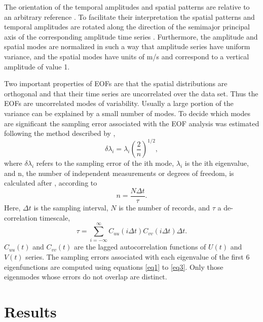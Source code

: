 The orientation of the temporal amplitudes and spatial patterns
are relative to an arbitrary reference \citep{kundu76}. To
facilitate their interpretation the spatial patterns and temporal
amplitudes are rotated along the direction of the semimajor
principal axis of the corresponding amplitude time series
\citep{merrifield89}. Furthermore, the amplitude and spatial modes
are normalized in such a way that amplitude series have uniform
variance, and the spatial modes have units of m/s and correspond
to a vertical amplitude of value 1.

Two important properties of EOFs are that the spatial
distributions are orthogonal and that their time series are
uncorrelated over the data set. Thus the EOFs are uncorrelated
modes of variability. Usually a large portion of the variance can
be explained by a small number of modes. To decide which modes are
significant the sampling error associated with the EOF analysis
was estimated following the method described by \citet{north82},
\begin{equation}\label{eq1}
  \delta \lambda_i = \lambda_i \left(\frac{2}{n} \right)^{1/2},
\end{equation}
where $\delta \lambda_i$ refers to the sampling error of the ith
mode, $\lambda_i$ is the ith eigenvalue, and n, the number of
independent measurements or degrees of freedom, is calculated
after \citet{davies76}, according to
\begin{equation}\label{eq2}
  n=\frac{N\Delta t}{\tau}.
\end{equation}
Here, $\Delta t$ is the sampling interval, $N$ is the number of
records, and $\tau$ a de-correlation timescale,
\begin{equation}\label{eq3}
  \tau = \sum_{i=-\infty}^{\infty} C_{uu}(i\Delta t) C_{vv}(i\Delta
  t)\Delta t.
\end{equation}
$C_{uu}(t)$ and $C_{vv}(t)$ are the lagged autocorrelation
functions of $U(t)$ and $V(t)$ series. The sampling errors
associated with each eigenvalue of the first 6 eigenfunctions are
computed using equations \ref{eq1} to \ref{eq3}. Only those
eigenmodes whose errors do not overlap are distinct.


\section{Results}

